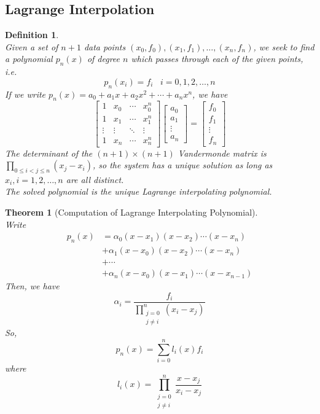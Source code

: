 \documentclass[12pt]{article}
\newtheorem{definition}{Definition}[section]
\newtheorem{theorem}{Theorem}[section]
\theoremstyle{definition}
\begin{document}
\subsection{Lagrange Interpolation}
\begin{definition}\hfill\\\normalfont
Given a set of $n+1$ data points $(x_0,f_0),(x_1,f_1),\ldots,(x_n,f_n)$, we seek to find a polynomial $p_n(x)$ of degree $n$ which passes through each of the given points, i.e.
\[
p_n(x_i)=f_i\;\;\;i = 0,1,2,\ldots, n
\]
If we write $p_n(x)= a_0+a_1x+a_2x^2+\cdots+a_nx^n$, we have
\[
\begin{bmatrix}
1&x_0&\cdots&x_0^n\\
1&x_1&\cdots&x_1^n\\
\vdots&\vdots&\ddots&\vdots\\
1&x_n&\cdots&x_n^n
\end{bmatrix}\begin{bmatrix}a_0\\a_1\\\vdots\\a_n\end{bmatrix} = \begin{bmatrix}f_0\\f_1\\\vdots\\f_n\end{bmatrix}
\]
The determinant of the $(n+1)\times(n+1)$ Vandermonde matrix is $\displaystyle\prod_{0\leq i<j\leq n}(x_j-x_i)$, so the system has a unique solution as long as $x_i, i = 1,2,\ldots, n$ are all distinct.\\
The solved polynomial is the unique Lagrange interpolating polynomial.
\end{definition}
\begin{theorem}[Computation of Lagrange Interpolating Polynomial]
\hfill\\\normalfont Write
\begin{align*}
p_n(x)&=\alpha_0(x-x_1)(x-x_2)\cdots(x-x_n)\\
&+\alpha_1(x-x_0)(x-x_2)\cdots(x-x_n)\\
&+\cdots\\
&+\alpha_n(x-x_0)(x-x_1)\cdots(x-x_{n-1})
\end{align*}
Then, we have
\[
 \alpha_i = \frac{f_i}{\displaystyle\prod_{\substack{j=0\\ j\neq i}}^n(x_i-x_j)}
\]
So,
\[
p_n(x) = \sum_{i=0}^n l_i(x)f_i
\]
where
\[
l_i(x) = \prod_{\substack{j=0\\j\neq i}}^n\frac{x-x_j}{x_i-x_j}
\]
\end{theorem}
\end{document}
